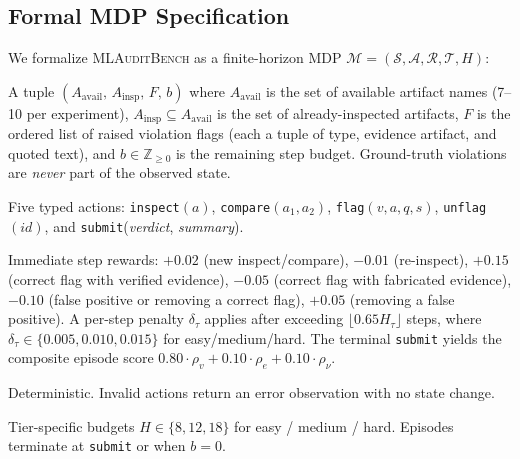 \documentclass{article}
\begin{document}
\subsection{Formal MDP Specification}
\label{sec:mdp}

We formalize \textsc{MLAuditBench} as a finite-horizon MDP $\mathcal{M}
= (\mathcal{S}, \mathcal{A}, \mathcal{R}, \mathcal{T}, H)$:

\begin{description}[leftmargin=1.5em, labelindent=0em]
      \item[\textbf{State} $s \in \mathcal{S}$:]
            A tuple $(A_\text{avail},\, A_\text{insp},\, F,\, b)$ where
            $A_\text{avail}$ is the set of available artifact names
            (7--10 per experiment),
            $A_\text{insp} \subseteq A_\text{avail}$ is the set of
            already-inspected artifacts,
            $F$ is the ordered list of raised violation flags (each a
            tuple of type, evidence artifact, and quoted text),
            and $b \in \mathbb{Z}_{\geq 0}$ is the remaining step budget.
            Ground-truth violations are \emph{never} part of the
            observed state.

      \item[\textbf{Action} $a \in \mathcal{A}$:]
            Five typed actions: \texttt{inspect}$(a)$,
            \texttt{compare}$(a_1, a_2)$,
            \texttt{flag}$(v, a, q, s)$, \texttt{unflag}$(id)$, and
            \texttt{submit}(\textit{verdict}, \textit{summary}).

      \item[\textbf{Reward} $\mathcal{R}$:]
            Immediate step rewards: $+0.02$ (new inspect/compare),
            $-0.01$ (re-inspect), $+0.15$ (correct flag with verified
            evidence), $-0.05$ (correct flag with fabricated evidence),
            $-0.10$ (false positive or removing a correct flag),
            $+0.05$ (removing a false positive).  A per-step penalty
            $\delta_\tau$ applies after exceeding $\lfloor 0.65 H_\tau
            \rfloor$ steps, where $\delta_\tau \in \{0.005, 0.010,
            0.015\}$ for easy/medium/hard.  The terminal \texttt{submit}
            yields the composite episode score
            $0.80 \cdot \rho_v + 0.10 \cdot \rho_e + 0.10 \cdot
            \rho_\nu$.

      \item[\textbf{Transition} $\mathcal{T}$:]
            Deterministic.  Invalid actions return an error observation
            with no state change.

      \item[\textbf{Horizon} $H$:]
            Tier-specific budgets $H \in \{8, 12, 18\}$ for easy /
            medium / hard.  Episodes terminate at \texttt{submit} or
            when $b=0$.
\end{description}
\end{document}
